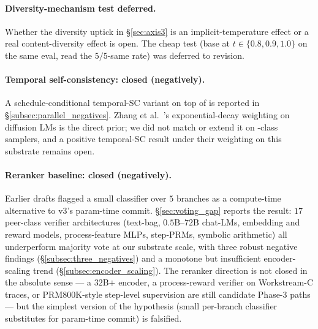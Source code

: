 \paragraph{Diversity-mechanism test deferred.}  Whether the
diversity uptick in \S\ref{sec:axis3} is an
implicit-temperature effect or a real content-diversity effect
is open.  The cheap test (base \LLaDA{} at $t \in \{0.8, 0.9,
1.0\}$ on the same eval, read the $5/5$-same rate) was deferred
to revision.

\paragraph{Temporal self-consistency: closed (negatively).}
A schedule-conditional temporal-SC variant on top of \cmajc{} is
reported in \S\ref{subsec:parallel_negatives}.  Zhang et
al.~\citep{zhang2025timefeature}'s exponential-decay weighting on
diffusion LMs is the direct prior; we did not match or extend it on
\LLaDA{}-class samplers, and a positive temporal-SC result under
their weighting on this substrate remains open.

\paragraph{Reranker baseline: closed (negatively).}  Earlier
drafts flagged a small classifier over $5$ \cmaj{} branches as a
compute-time alternative to v3's param-time commit.
\S\ref{sec:voting_gap} reports the result: $17$ peer-class
verifier architectures (text-bag, $0.5$B--$72$B chat-LMs,
embedding and reward models, process-feature MLPs, step-PRMs,
symbolic arithmetic) all underperform majority vote at our
substrate scale, with three robust negative findings
(\S\ref{subsec:three_negatives}) and a monotone but insufficient
encoder-scaling trend (\S\ref{subsec:encoder_scaling}).  The
reranker direction is not closed in the absolute sense --- a
$32$B$+$ encoder, a process-reward verifier on Workstream-C
traces, or PRM800K-style step-level supervision are still
candidate Phase-3 paths --- but the simplest version of the
hypothesis (small per-branch classifier substitutes for
param-time commit) is falsified.
